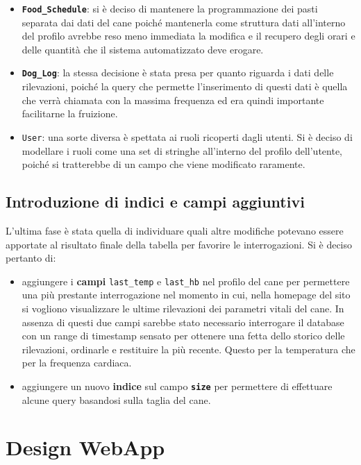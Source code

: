     \begin{itemize}
        \item \textbf{\texttt{Food\_Schedule}}: si è deciso di mantenere la programmazione dei pasti separata dai dati del cane poiché mantenerla come struttura dati all'interno del profilo avrebbe reso meno immediata la modifica e il recupero degli orari e delle quantità che il sistema automatizzato deve erogare.  
        \item \textbf{\texttt{Dog\_Log}}: la stessa decisione è stata presa per quanto riguarda i dati delle rilevazioni, poiché la query che permette l'inserimento di questi dati è quella che verrà chiamata con la massima frequenza ed era quindi importante facilitarne la fruizione.
        \item \texttt{\texttt{User}}: una sorte diversa è spettata ai ruoli ricoperti dagli utenti. Si è deciso di modellare i ruoli come una set di stringhe all'interno del profilo dell'utente, poiché si tratterebbe di un campo che viene modificato raramente.
    \end{itemize}
    
    \subsection{Introduzione di indici e campi aggiuntivi}
    L'ultima fase è stata quella di individuare quali altre modifiche potevano essere apportate al risultato finale della tabella per favorire le interrogazioni.
    Si è deciso pertanto di:
    \begin{itemize}
        \item aggiungere i \textbf{campi} \texttt{last\_temp} e \texttt{last\_hb} nel profilo del cane per permettere una più prestante interrogazione nel momento in cui, nella homepage del sito si vogliono visualizzare le ultime rilevazioni dei parametri vitali del cane. In assenza di questi due campi sarebbe stato necessario interrogare il database con un range di timestamp sensato per ottenere una fetta dello storico delle rilevazioni, ordinarle e restituire la più recente. Questo per la temperatura che per la frequenza cardiaca.
        \item aggiungere un nuovo \textbf{indice} sul campo \textbf{\texttt{size}} per permettere di effettuare alcune query basandosi sulla taglia del cane.
    \end{itemize}
    
    
\section{Design WebApp}

